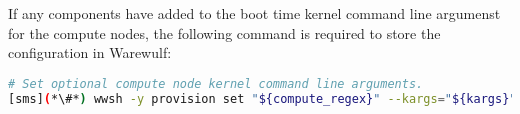 If any components have added to the boot time kernel command line argumenst for the compute nodes,
the following command is required to store the configuration in Warewulf:
\begin{lstlisting}[language=bash,keywords={},upquote=true,basicstyle=\footnotesize\ttfamily]
# Set optional compute node kernel command line arguments.
[sms](*\#*) wwsh -y provision set "${compute_regex}" --kargs="${kargs}"
\end{lstlisting}
